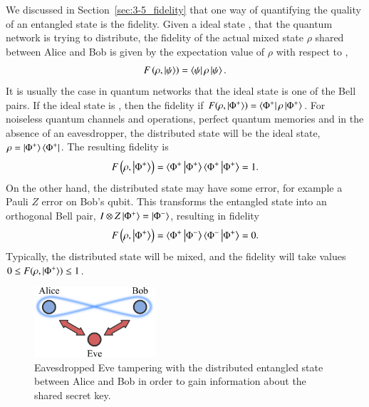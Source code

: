 We discussed in Section~\ref{sec:3-5_fidelity} that one way of quantifying the quality of an entangled state is the fidelity.
Given a ideal state \ket{\psi}, that the quantum network is trying to distribute, the fidelity of the actual mixed state $\rho$ shared between Alice and Bob is given by the expectation value of $\rho$ with respect to \ket{\psi},
\begin{equation}
    F \left( \rho, \left| \psi \right\rangle \right) = \left\langle \psi \right|\rho\left| \psi \right\rangle.
\end{equation}
It is usually the case in quantum networks that the ideal state is one of the Bell pairs.
If the ideal state is \ket{\Phi^+}, then the fidelity if $F (\rho, \left| \Phi^+ \right\rangle) = \left\langle \Phi^+ \right|\rho\left| \Phi^+ \right\rangle$.
For noiseless quantum channels and operations, perfect quantum memories and in the absence of an eavesdropper, the distributed state will be the ideal state, $\rho = \left| \Phi^+ \right\rangle\left\langle \Phi^+ \right|$.
The resulting fidelity is
\begin{equation}
    F \left( \rho, \left| \Phi^+ \right\rangle \right) = \langle\Phi^+\left| \Phi^+ \right\rangle \langle\Phi^+\left| \Phi^+ \right\rangle = 1.
\end{equation}
On the other hand, the distributed state may have some error, for example a Pauli $Z$ error on Bob's qubit.
This transforms the entangled state into an orthogonal Bell pair, $I \otimes Z \left| \Phi^+ \right\rangle = \left| \Phi^- \right\rangle$, resulting in fidelity
\begin{equation}
    F \left( \rho, \ket{\Phi^+} \right) = \langle\Phi^+\ket{\Phi^-} \langle\Phi^-\ket{\Phi^+} = 0.
    \label{eq:14-1_fidelity_0}
\end{equation}
Typically, the distributed state will be mixed, and the fidelity will take values $ 0 \leq F(\rho, \left| \Phi^+ \right\rangle) \leq 1$.

\begin{figure}[t]
    \centering
    \includegraphics[width=0.4\textwidth]{lesson14/14-1_QKD.pdf}
    \caption[Eavesdropper Eve]{Eavesdropped Eve tampering with the distributed entangled state between Alice and Bob in order to gain information about the shared secret key.}
    \label{fig:14-1_QKD}
\end{figure}

